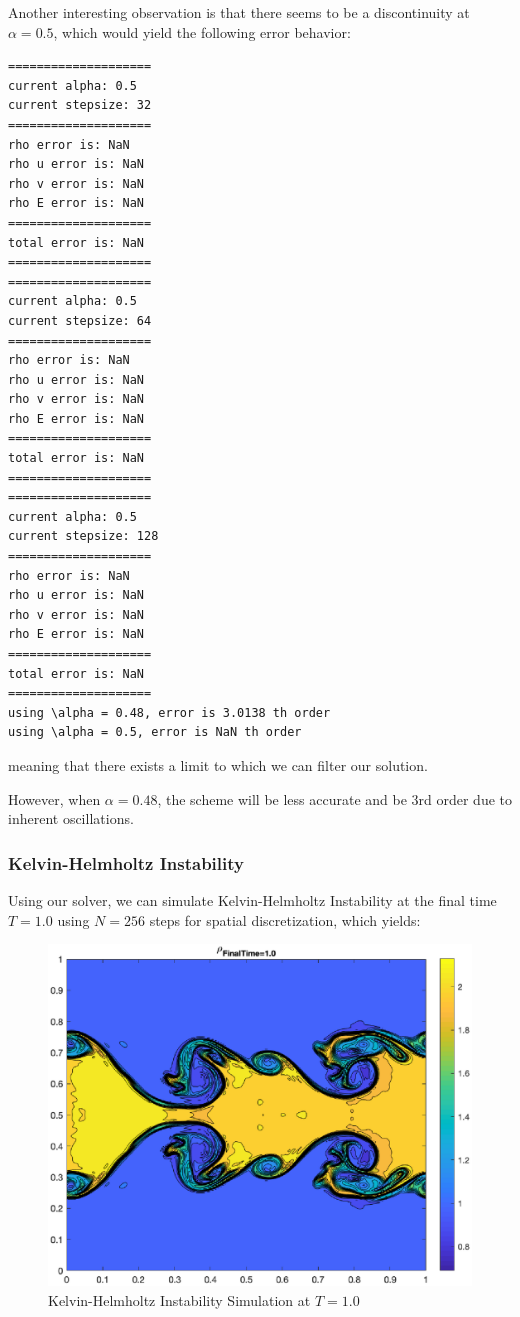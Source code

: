 \documentclass[12pt]{article}
\begin{document}
Another interesting observation is that there seems to be a discontinuity at $\alpha=0.5$, which would yield the following error behavior:
\begin{verbatim}
====================
current alpha: 0.5
current stepsize: 32
====================
rho error is: NaN
rho u error is: NaN
rho v error is: NaN
rho E error is: NaN
====================
total error is: NaN
====================
====================
current alpha: 0.5
current stepsize: 64
====================
rho error is: NaN
rho u error is: NaN
rho v error is: NaN
rho E error is: NaN
====================
total error is: NaN
====================
====================
current alpha: 0.5
current stepsize: 128
====================
rho error is: NaN
rho u error is: NaN
rho v error is: NaN
rho E error is: NaN
====================
total error is: NaN
====================
using \alpha = 0.48, error is 3.0138 th order
using \alpha = 0.5, error is NaN th order
\end{verbatim} 
meaning that there exists a limit to which we can filter our solution.

However, when $\alpha = 0.48$, the scheme will be less accurate and be 3rd order due to inherent oscillations.

\subsubsection{Kelvin-Helmholtz Instability}
Using our solver, we can simulate Kelvin-Helmholtz Instability at the final time $T = 1.0$ using $N=256$ steps for spatial discretization, which yields:
\begin{figure}[h]
\centering
\includegraphics[width=1.0\textwidth]{kelvin_eps.eps}
\caption{Kelvin-Helmholtz Instability Simulation at $T=1.0$}
\end{figure}
\end{document}
